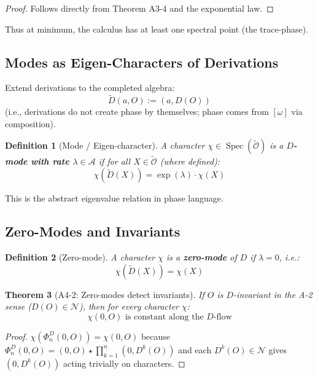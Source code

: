 \documentclass[12pt, oneside]{article}
\newtheorem{theorem}{Theorem}[section]
\newtheorem{definition}[theorem]{Definition}
\DeclareMathOperator{\Spec}{Spec}
\newcommand{\N}{\mathcal{N}}
\newcommand{\A}{\mathcal{A}}
\newcommand{\Opr}{\mathcal{O}}
\newcommand{\wtilde}{\widetilde}
\begin{document}
\begin{proof}
Follows directly from Theorem A3-4 and the exponential law.
\end{proof}

Thus at minimum, the calculus has at least one spectral point (the trace-phase).

\subsection{Modes as Eigen-Characters of Derivations}

Extend derivations to the completed algebra:
\begin{equation}
\wtilde{D}(a, O) := (a, D(O))
\end{equation}
(i.e., derivations do not create phase by themselves; phase comes from $[\omega]$ via composition).

\begin{definition}[Mode / Eigen-character]
A character $\chi \in \Spec(\wtilde{\Opr})$ is a \textbf{$D$-mode with rate $\lambda \in \A$} if for all $X \in \wtilde{\Opr}$ (where defined):
\begin{equation}
\chi(\wtilde{D}(X)) = \exp(\lambda) \cdot \chi(X)
\end{equation}
\end{definition}

This is the abstract eigenvalue relation in phase language.

\subsection{Zero-Modes and Invariants}

\begin{definition}[Zero-mode]
A character $\chi$ is a \textbf{zero-mode} of $D$ if $\lambda = 0$, i.e.:
\begin{equation}
\chi(\wtilde{D}(X)) = \chi(X)
\end{equation}
\end{definition}

\begin{theorem}[A4-2: Zero-modes detect invariants]
If $O$ is $D$-invariant in the A-2 sense ($D(O) \in \N$), then for every character $\chi$:
\begin{equation}
\chi(0, O) \text{ is constant along the $D$-flow}
\end{equation}
\end{theorem}

\begin{proof}
$\chi(\Phi_n^D(0, O)) = \chi(0, O)$ because $\Phi_n^D(0, O) = (0, O) \star \prod_{k=1}^n (0, D^k(O))$ and each $D^k(O) \in \N$ gives $(0, D^k(O))$ acting trivially on characters.
\end{proof}
\end{document}
